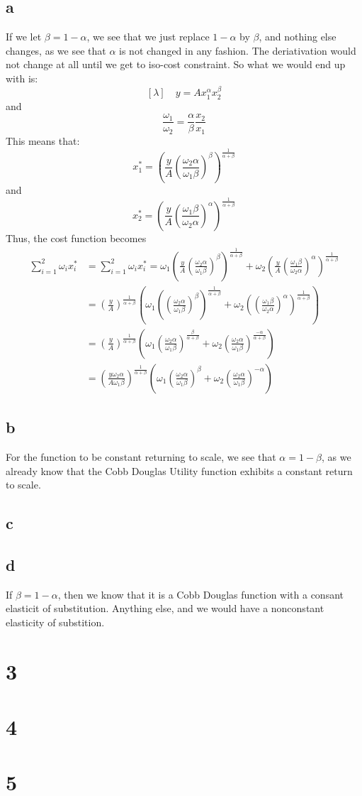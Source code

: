 \documentclass[11pt]{article}
\begin{document}
\subsection*{a}
If we let $\beta = 1-\alpha$, we see that we just replace $1 -\alpha$ by $\beta$, and nothing else changes, as we see that $\alpha$ is not changed in any fashion. The deriativation would not change at all until we get to iso-cost constraint. So what we would end up with is:
\[
[\lambda] \quad y = Ax_1^\alpha x_2^\beta
\]
and 
\[
\frac{\omega_1}{\omega_2} = \frac{\alpha}{\beta} \frac{x_2}{x_1}
\]
This means that:
\[
x_1^* = \left( \frac{y}{A} \left( \frac{\omega_2 \alpha}{\omega_1 \beta} \right)^\beta \right)^{\frac{1}{\alpha + \beta}}
\]
and 
\[
x_2^* = \left( \frac{y}{A} \left( \frac{\omega_1 \beta}{\omega_2 \alpha} \right)^\alpha \right)^{\frac{1}{\alpha + \beta}}
\]
Thus, the cost function becomes 
\begin{align*}
    \sum_{i =1}^2 \omega_i x_i^* &= 
    \sum_{i = 1}^2 \omega_i x_i^* = \omega_1 \left( \frac{y}{A} \left( \frac{\omega_2 \alpha}{\omega_1 \beta} \right)^\beta \right)^{\frac{1}{\alpha + \beta}} + \omega_2 \left( \frac{y}{A} \left( \frac{\omega_1 \beta}{\omega_2 \alpha} \right)^\alpha \right)^{\frac{1}{\alpha + \beta}}\\
    &= \left( \frac{y}{A} \right)^{\frac{1}{\alpha + \beta}} \left( \omega_1 \left(\left( \frac{\omega_2 \alpha}{\omega_1 \beta} \right)^\beta \right)^\frac{1}{\alpha + \beta} + \omega_2 \left( \left( \frac{\omega_1 \beta}{\omega_2 \alpha} \right)^\alpha\right)^\frac{1}{\alpha + \beta}\right)\\
    &= \left( \frac{y}{A} \right)^\frac{1}{\alpha + \beta} \left( \omega_1 \left( \frac{\omega_2 \alpha}{\omega_1 \beta} \right)^\frac{\beta}{\alpha + \beta} + \omega_2 \left( \frac{\omega_2 \alpha}{\omega_1 \beta} \right)^\frac{-\alpha}{\alpha + \beta} \right)\\
    &= \left( \frac{y \omega_2 \alpha}{A \omega_1 \beta} \right)^\frac{1}{\alpha + \beta} \left( \omega_1 \left( \frac{\omega_2 \alpha}{\omega_1 \beta} \right)^\beta + \omega_2 \left( \frac{\omega_2 \alpha}{\omega_1 \beta} \right)^{-\alpha} \right)
\end{align*}
\subsection*{b}
For the function to be constant returning to scale, we see that $\alpha = 1 - \beta$, as we already know that the Cobb Douglas Utility function exhibits a constant return to scale. 
\subsection*{c}
\subsection*{d}
If $\beta = 1 - \alpha$, then we know that it is a Cobb Douglas function with a consant elasticit of substitution. Anything else, and we would have a nonconstant elasticity of substition.  
\section*{3}
\section*{4}
\section*{5}
\end{document}
